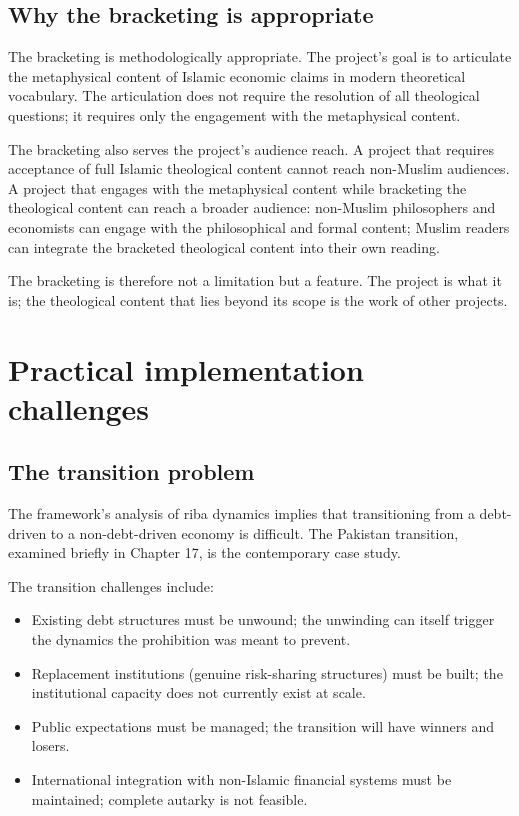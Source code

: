 \subsection{Why the bracketing is appropriate}

The bracketing is methodologically appropriate. The project's
goal is to articulate the metaphysical content of Islamic
economic claims in modern theoretical vocabulary. The
articulation does not require the resolution of all theological
questions; it requires only the engagement with the
metaphysical content.

The bracketing also serves the project's audience reach. A
project that requires acceptance of full Islamic theological
content cannot reach non-Muslim audiences. A project that engages
with the metaphysical content while bracketing the theological
content can reach a broader audience: non-Muslim philosophers and
economists can engage with the philosophical and formal content;
Muslim readers can integrate the bracketed theological content
into their own reading.

The bracketing is therefore not a limitation but a feature. The
project is what it is; the theological content that lies beyond
its scope is the work of other projects.

\section{Practical implementation challenges}
\label{sec:open-practical}

\subsection{The transition problem}

The framework's analysis of riba dynamics implies that
transitioning from a debt-driven to a non-debt-driven economy is
difficult. The Pakistan transition, examined briefly in Chapter
17, is the contemporary case study.

The transition challenges include:

\begin{itemize}[leftmargin=2em]
    \item Existing debt structures must be unwound; the unwinding
    can itself trigger the dynamics the prohibition was meant to
    prevent.
    \item Replacement institutions (genuine risk-sharing
    structures) must be built; the institutional capacity does
    not currently exist at scale.
    \item Public expectations must be managed; the transition will
    have winners and losers.
    \item International integration with non-Islamic financial
    systems must be maintained; complete autarky is not feasible.
\end{itemize}

